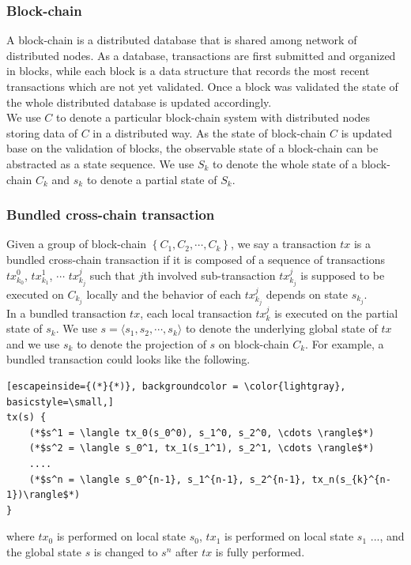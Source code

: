 \documentclass[pageno]{jpaper}
\begin{document}
\subsubsection{Block-chain}
A block-chain is a distributed database that is shared among network of distributed nodes\cite{chen2018survey}. As a database, transactions are first submitted and organized in blocks, while each block is a data structure that records the most recent transactions which are not yet validated. Once a block was validated the state of the whole distributed database is updated accordingly.\\
\newline
We use $C$ to denote a particular block-chain system with distributed nodes storing data of $C$ in a distributed way. As the state of block-chain $C$ is updated base on the validation of blocks, the observable state of a block-chain can be abstracted as a state sequence. We use $S_k$ to denote the whole state of a block-chain $C_{k}$ and $s_k$ to denote a partial state of $S_k$.
\\
\subsubsection{Bundled cross-chain transaction}
Given a group of block-chain $\left\{C_{1}, C_{2}, \cdots, C_{k}\right\}$, we say a transaction $tx$ is a bundled cross-chain transaction if it is composed of a sequence of transactions $tx_{k_0}^0$, $tx_{k_1}^1$, $\cdots$ $tx_{k_j}^j$ such that $j$th involved sub-transaction $tx_{k_j}^j$ is supposed to be executed on $C_{k_j}$ locally and the behavior of each $tx_{k_j}^{j}$ depends on state $s_{k_j}$. \\
\newline
In a bundled transaction $tx$, each local transaction $tx_k^j$ is executed on the partial state of $s_k$. We use $s= \langle s_1, s_2, \cdots, s_k \rangle$ to denote the underlying global state of $tx$ and we use $s_k$ to denote the projection of $s$ on block-chain $C_k$. For example, a bundled transaction could looks like the following. 
\begin{lstlisting}[escapeinside={(*}{*)}, backgroundcolor = \color{lightgray}, basicstyle=\small,]
tx(s) {
    (*$s^1 = \langle tx_0(s_0^0), s_1^0, s_2^0, \cdots \rangle$*)
    (*$s^2 = \langle s_0^1, tx_1(s_1^1), s_2^1, \cdots \rangle$*)
    ....
    (*$s^n = \langle s_0^{n-1}, s_1^{n-1}, s_2^{n-1}, tx_n(s_{k}^{n-1})\rangle$*)
}
\end{lstlisting}
where $tx_0$ is performed on local state $s_0$, $tx_1$ is performed on local state $s_1$ ..., and the global state $s$ is changed to $s^n$ after $tx$ is fully performed.
\\
\end{document}
